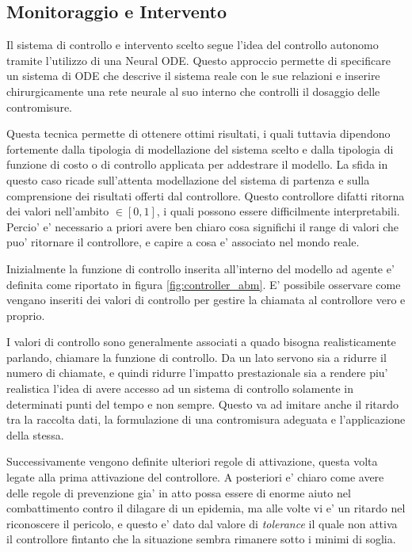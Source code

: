 \subsection{Monitoraggio e Intervento}
Il sistema di controllo e intervento scelto segue l'idea del controllo autonomo tramite l'utilizzo di 
una Neural ODE. Questo approccio permette di specificare un sistema di ODE che descrive il sistema reale 
con le sue relazioni e inserire chirurgicamente una rete neurale al suo interno che controlli il 
dosaggio delle contromisure. \cite{B_ttcher_2022} \cite{innes2019differentiable} \cite{sandoval2022neural}

Questa tecnica permette di ottenere ottimi risultati, i quali tuttavia dipendono fortemente dalla 
tipologia di modellazione del sistema scelto e dalla tipologia di funzione di costo o di controllo 
applicata per addestrare il modello. La sfida in questo caso ricade sull'attenta modellazione del 
sistema di partenza e sulla comprensione dei risultati offerti dal controllore. Questo controllore 
difatti ritorna dei valori nell'ambito $\in[0, 1]$, i quali possono essere difficilmente interpretabili.
Percio' e' necessario a priori avere ben chiaro cosa significhi il range di valori che puo' ritornare
il controllore, e capire a cosa e' associato nel mondo reale. 

Inizialmente la funzione di controllo inserita all'interno del modello ad agente e' definita 
come riportato in figura \ref{fig:controller_abm}. E' possibile osservare come vengano inseriti dei valori di 
controllo per gestire la chiamata al controllore vero e proprio.

I valori di controllo sono generalmente associati a quado bisogna realisticamente parlando, chiamare la 
funzione di controllo. Da un lato servono sia a ridurre il numero di chiamate, e quindi ridurre l'impatto 
prestazionale sia a rendere piu' realistica l'idea di avere accesso ad un sistema di controllo solamente 
in determinati punti del tempo e non sempre. Questo va ad imitare anche il ritardo tra la raccolta dati, 
la formulazione di una contromisura adeguata e l'applicazione della stessa.

Successivamente vengono definite ulteriori regole di attivazione, questa volta legate alla prima attivazione
del controllore. A posteriori e' chiaro come avere delle regole di prevenzione gia' in atto possa essere di 
enorme aiuto nel combattimento contro il dilagare di un epidemia, ma alle volte vi e' un ritardo nel riconoscere
il pericolo, e questo e' dato dal valore di \emph{tolerance} il quale non attiva il controllore fintanto che 
la situazione sembra rimanere sotto i minimi di soglia. 

